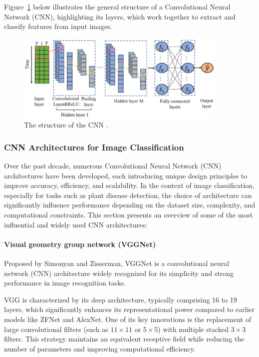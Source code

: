 Figure~\ref{fig:figure07} below illustrates the general structure of a Convolutional Neural Network (CNN), highlighting its layers, which work together to extract and classify features from input images.

\begin{figure}[H] %
    \centering
    \includegraphics[width=0.9\textwidth]{chapters/chapter1/images/Figure07.png}
    \caption{The structure of the CNN \parencite{crocioni2020li}.}
    \label{fig:figure07}
\end{figure}


\subsubsection{CNN Architectures for Image Classification}
Over the past decade, numerous Convolutional Neural Network (CNN) architectures have been developed, each introducing unique design principles to improve accuracy, efficiency, and scalability. In the context of image classification, especially for tasks such as plant disease detection, the choice of architecture can significantly influence performance depending on the dataset size, complexity, and computational constraints.
This section presents an overview of some of the most influential and widely used CNN architectures:

\paragraph{Visual geometry group network (VGGNet)}
Proposed by Simonyan and Zisserman, VGGNet is a convolutional neural network (CNN) architecture widely recognized for its simplicity and strong performance in image recognition tasks.

VGG is characterized by its deep architecture, typically comprising 16 to 19 layers, which significantly enhances its representational power compared to earlier models like ZFNet and AlexNet. One of its key innovations is the replacement of large convolutional filters (such as $11 \times 11$ or $5 \times 5$) with multiple stacked $3 \times 3$ filters. This strategy maintains an equivalent receptive field while reducing the number of parameters and improving computational efficiency.

